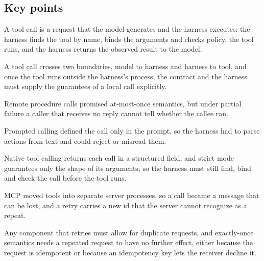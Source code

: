 \subsection*{Key points}
\bi
\item A tool call is a request that the model generates and the harness executes: the harness finds
the tool by name, binds the arguments and checks policy, the tool runs, and the harness returns the
observed result to the model.
\item A tool call crosses two boundaries, model to harness and harness to tool, and once the tool
runs outside the harness's process, the contract and the harness must supply the guarantees of a
local call explicitly.
\item Remote procedure calls promised at-most-once semantics, but under partial failure a caller
that receives no reply cannot tell whether the callee ran.
\item Prompted calling defined the call only in the prompt, so the harness had to parse actions from
text and could reject or misread them.
\item Native tool calling returns each call in a structured field, and strict mode guarantees only
the shape of its arguments, so the harness must still find, bind and check the call before the tool
runs.
\item MCP moved tools into separate server processes, so a call became a message that can be lost,
and a retry carries a new id that the server cannot recognize as a repeat.
\item Any component that retries must allow for duplicate requests, and exactly-once semantics needs
a repeated request to have no further effect, either because the request is idempotent or because an
idempotency key lets the receiver decline it.
\ei
